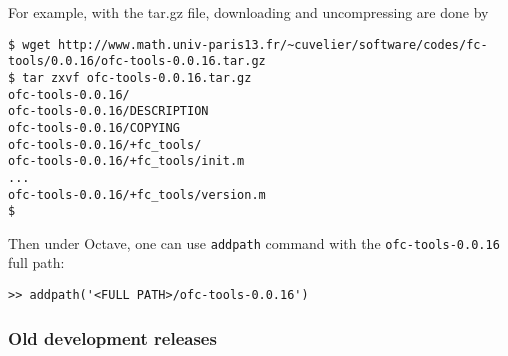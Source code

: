 For example, with the tar.gz file, downloading and uncompressing are done by 
\begin{verbatim}
$ wget http://www.math.univ-paris13.fr/~cuvelier/software/codes/fc-tools/0.0.16/ofc-tools-0.0.16.tar.gz
$ tar zxvf ofc-tools-0.0.16.tar.gz
ofc-tools-0.0.16/
ofc-tools-0.0.16/DESCRIPTION
ofc-tools-0.0.16/COPYING
ofc-tools-0.0.16/+fc_tools/
ofc-tools-0.0.16/+fc_tools/init.m
...
ofc-tools-0.0.16/+fc_tools/version.m
$
\end{verbatim}
Then under Octave, one can use \texttt{addpath} command with the \texttt{ofc-tools-0.0.16} full path:
\begin{verbatim}
>> addpath('<FULL PATH>/ofc-tools-0.0.16')
\end{verbatim}
 
 
\subsubsection{Old development releases} 
\immediate{}
\immediate{}
\immediate{}
